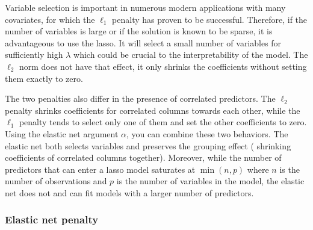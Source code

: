 
Variable selection is important in numerous modern applications with many covariates, for which the $\ell_1$ penalty has proven to be successful. Therefore, if the number of variables is large or if the solution is known to be sparse, it is advantageous to use the lasso. It will select a small number of variables for sufficiently high $\lambda$ which could be crucial to the interpretability of the model. The $\ell_2$ norm does not have that effect, it only shrinks the coefficients without setting them exactly to zero.  %

The two penalties also differ in the presence of correlated
predictors. The $\ell_2$ penalty shrinks coefficients for correlated columns towards each other, while the $\ell_1$ penalty
tends to select only one of them and set the other coefficients to zero. Using the elastic net argument $\alpha$, you can combine these two
behaviors. The elastic net both selects variables and preserves the grouping effect ( shrinking coefficients of correlated columns together). Moreover, while the number of predictors that can enter a lasso model saturates at $\min(n,p)$ where $n$ is the number of observations and $p$ is the number of variables in the model, the elastic net does not and can fit models with a larger number of predictors. %

\subsubsection{Elastic net penalty}

